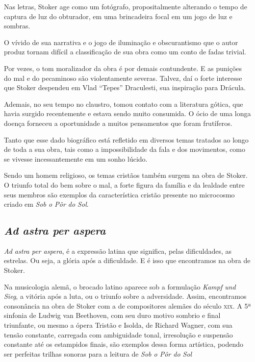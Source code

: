 \documentclass[12pt]{extarticle}
\begin{document}

Nas letras, Stoker age como um fotógrafo, propositalmente alterando o
tempo de captura de luz do obturador, em uma brincadeira focal em um
jogo de luz e sombras.

O vívido de sua narrativa e o jogo de iluminação e obscurantismo que o
autor produz tornam difícil a classificação de sua obra como um conto de
fadas trivial.

Por vezes, o tom moralizador da obra é por demais contundente. E as
punições do mal e do pecaminoso são violentamente severas. Talvez, daí o
forte interesse que Stoker despendeu em Vlad ``Tepes'' Draculesti, sua
inspiração para Drácula.


Ademais, no seu tempo no claustro, tomou contato com a literatura
gótica, que havia surgido recentemente e estava sendo muito consumida. O
ócio de uma longa doença forneceu a oportunidade a muitos pensamentos
que foram frutíferos.

Tanto que esse dado biográfico está refletido em diversos temas tratados
ao longo de toda a sua obra, tais como a impossibilidade da fala e dos
movimentos, como se vivesse incessantemente em um sonho lúcido.

Sendo um homem religioso, os temas cristãos também surgem na obra de
Stoker. O triunfo total do bem sobre o mal, a forte figura da família e
da lealdade entre seus membros são exemplos da característica cristão
presente no microcosmo criado em \emph{Sob o Pôr do Sol}.

\subsection{\textit{Ad astra per aspera}}

\emph{Ad astra per aspera}, é a expressão latina que significa, pelas
dificuldades, as estrelas. Ou seja, a glória após a dificuldade. E é
isso que encontramos na obra de Stoker.

Na musicologia alemã, o brocado latino aparece sob a formulação
\emph{Kampf und Sieg}, a vitória após a luta, ou o triunfo sobre a
adversidade. Assim, encontramos consonância na obra de Stoker com a de
compositores alemães do século \textsc{xix}. A 5ª sinfonia de Ludwig van
Beethoven, com seu duro motivo sombrio e final triunfante, ou mesmo a
ópera Tristão e Isolda, de Richard Wagner, com sua tensão constante,
carregada com ambiguidade tonal, irresolução e suspensão constante até
os estampidos finais, são exemplos dessa forma artística, podendo ser
perfeitas trilhas sonoras para a leitura de \emph{Sob o Pôr do Sol}
\end{document}
